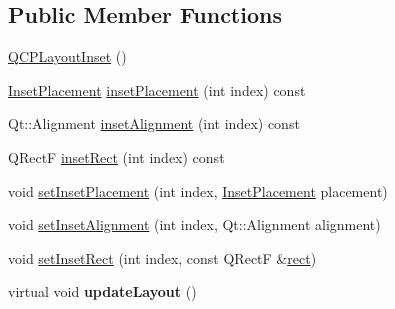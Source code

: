 \subsection*{Public Member Functions}
\begin{DoxyCompactItemize}
\item 
\hyperlink{classQCPLayoutInset_a3ad984f3221735374cc5dee14356a7dd}{Q\+C\+P\+Layout\+Inset} ()
\item 
\hyperlink{classQCPLayoutInset_a8b9e17d9a2768293d2a7d72f5e298192}{Inset\+Placement} \hyperlink{classQCPLayoutInset_a8472ff2508807513e4cb0ce0c1d652b3}{inset\+Placement} (int index) const 
\item 
Qt\+::\+Alignment \hyperlink{classQCPLayoutInset_a78c0c494bb5728237cebb63ae8ef5c58}{inset\+Alignment} (int index) const 
\item 
Q\+Rect\+F \hyperlink{classQCPLayoutInset_a5ec7037b3b8d20fbf9560e01779b1442}{inset\+Rect} (int index) const 
\item 
void \hyperlink{classQCPLayoutInset_a63298830744d5d8c5345511c00fd2144}{set\+Inset\+Placement} (int index, \hyperlink{classQCPLayoutInset_a8b9e17d9a2768293d2a7d72f5e298192}{Inset\+Placement} placement)
\item 
void \hyperlink{classQCPLayoutInset_a62882a4f9ad58bb0f53da12fde022abe}{set\+Inset\+Alignment} (int index, Qt\+::\+Alignment alignment)
\item 
void \hyperlink{classQCPLayoutInset_aa487c8378a6f9533567a2e6430099dc3}{set\+Inset\+Rect} (int index, const Q\+Rect\+F \&\hyperlink{classQCPLayoutElement_affdfea003469aac3d0fac5f4e06171bc}{rect})
\item 
\hypertarget{classQCPLayoutInset_a7b33fdd51b18e6db7cea9bfb2d263b4a}{}virtual void {\bfseries update\+Layout} ()\label{classQCPLayoutInset_a7b33fdd51b18e6db7cea9bfb2d263b4a}


\end{DoxyCompactItemize}
